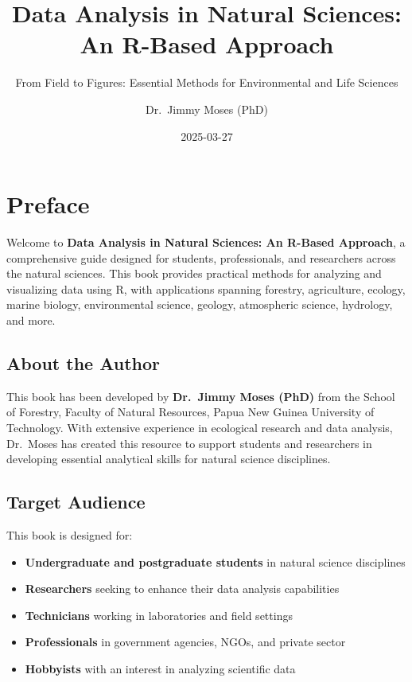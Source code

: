 \documentclass[
  letterpaper,
]{book}
\title{Data Analysis in Natural Sciences: An R-Based Approach}
\subtitle{From Field to Figures: Essential Methods for Environmental and
Life Sciences}
\author{Dr.~Jimmy Moses (PhD)}
\date{2025-03-27}
\providecommand{\tightlist}{%
  \setlength{\itemsep}{0pt}\setlength{\parskip}{0pt}}
\renewcommand*\contentsname{Table of contents}
\newcommand\contentsname{Table of contents}
\begin{document}
\frontmatter
\maketitle

\renewcommand*\contentsname{Table of contents}
{
\hypersetup{linkcolor=}
\setcounter{tocdepth}{2}
\tableofcontents
}

\mainmatter
{}

\chapter*{Preface}\label{preface}


Welcome to \textbf{Data Analysis in Natural Sciences: An R-Based
Approach}, a comprehensive guide designed for students, professionals,
and researchers across the natural sciences. This book provides
practical methods for analyzing and visualizing data using R, with
applications spanning forestry, agriculture, ecology, marine biology,
environmental science, geology, atmospheric science, hydrology, and
more.

\section*{About the Author}\label{about-the-author}


This book has been developed by \textbf{Dr.~Jimmy Moses (PhD)} from the
School of Forestry, Faculty of Natural Resources, Papua New Guinea
University of Technology. With extensive experience in ecological
research and data analysis, Dr.~Moses has created this resource to
support students and researchers in developing essential analytical
skills for natural science disciplines.

\section*{Target Audience}\label{target-audience}


This book is designed for:

\begin{itemize}
\tightlist
\item
  \textbf{Undergraduate and postgraduate students} in natural science
  disciplines
\item
  \textbf{Researchers} seeking to enhance their data analysis
  capabilities
\item
  \textbf{Technicians} working in laboratories and field settings
\item
  \textbf{Professionals} in government agencies, NGOs, and private
  sector
\item
  \textbf{Hobbyists} with an interest in analyzing scientific data
\end{itemize}
\end{document}
